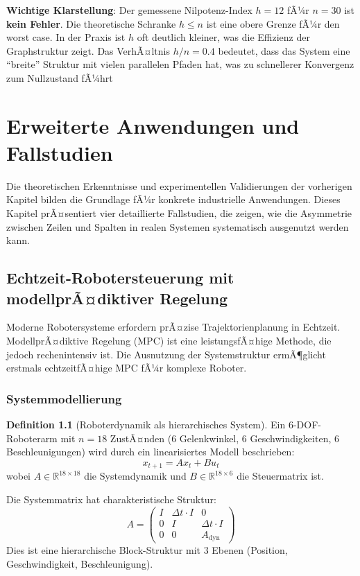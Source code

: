 ﻿\documentclass[a4paper,12pt]{report}
\theoremstyle{definition}
\newtheorem{definition}{Definition}
\begin{document}
	\textbf{Wichtige Klarstellung}: Der gemessene Nilpotenz-Index $h = 12$ fÃ¼r $n = 30$ ist \textbf{kein Fehler}. Die theoretische Schranke $h \leq n$ ist eine obere Grenze fÃ¼r den worst case. In der Praxis ist $h$ oft deutlich kleiner, was die Effizienz der Graphstruktur zeigt. Das VerhÃ¤ltnis $h/n = 0.4$ bedeutet, dass das System eine ``breite'' Struktur mit vielen parallelen Pfaden hat, was zu schnellerer Konvergenz zum Nullzustand fÃ¼hrt
	
	\chapter{Erweiterte Anwendungen und Fallstudien}
	
	Die theoretischen Erkenntnisse und experimentellen Validierungen der vorherigen Kapitel bilden die Grundlage fÃ¼r konkrete industrielle Anwendungen. Dieses Kapitel prÃ¤sentiert vier detaillierte Fallstudien, die zeigen, wie die Asymmetrie zwischen Zeilen und Spalten in realen Systemen systematisch ausgenutzt werden kann.
	
	\section{Echtzeit-Robotersteuerung mit modellprÃ¤diktiver Regelung}
	
	Moderne Robotersysteme erfordern prÃ¤zise Trajektorienplanung in Echtzeit. ModellprÃ¤diktive Regelung (MPC) ist eine leistungsfÃ¤hige Methode, die jedoch rechenintensiv ist. Die Ausnutzung der Systemstruktur ermÃ¶glicht erstmals echtzeitfÃ¤hige MPC fÃ¼r komplexe Roboter.
	
	\subsection{Systemmodellierung}
	
	\begin{definition}[Roboterdynamik als hierarchisches System]
		Ein 6-DOF-Roboterarm mit $n = 18$ ZustÃ¤nden (6 Gelenkwinkel, 6 Geschwindigkeiten, 6 Beschleunigungen) wird durch ein linearisiertes Modell beschrieben:
		\[
		x_{t+1} = A x_t + B u_t
		\]
		wobei $A \in \mathbb{R}^{18 \times 18}$ die Systemdynamik und $B \in \mathbb{R}^{18 \times 6}$ die Steuermatrix ist.
		
		Die Systemmatrix hat charakteristische Struktur:
		\[
		A = \begin{pmatrix}
			I & \Delta t \cdot I & 0 \\
			0 & I & \Delta t \cdot I \\
			0 & 0 & A_{\text{dyn}}
		\end{pmatrix}
		\]
		Dies ist eine hierarchische Block-Struktur mit 3 Ebenen (Position, Geschwindigkeit, Beschleunigung).
	\end{definition}
	
\end{document}
